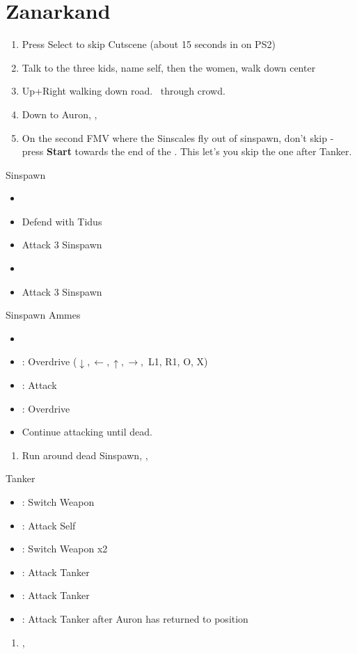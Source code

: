 \chapter{Zanarkand}\label{ch:zanarkand}

\begin{enumerate}
	\item Press Select to skip Cutscene (about 15 seconds in on PS2)
	\item Talk to the three kids, name self, then the women, walk down center
	\item Up+Right walking down road. \sd \ through crowd. \skippablefmv
	\item Down to Auron, \sd, \skippablefmv
	\item On the second FMV where the Sinscales fly out of sinspawn, don't skip - press \textbf{Start} towards the end of the \fmv. This let's you skip the one after Tanker. \sd
\end{enumerate}
\begin{battle}{Sinspawn}
	\begin{itemize}
		\item \sd
		\item Defend with Tidus
		\item Attack 3 Sinspawn
		\item \sd
		\item Attack 3 Sinspawn
	\end{itemize}
\end{battle}
\begin{battle}[2400]{Sinspawn Ammes}
	\begin{itemize}
		\item \sd
		\item \auron: Overdrive ($\downarrow, \leftarrow, \uparrow, \rightarrow,$ L1, R1, O, X)
		\item \tidus: Attack
		\item \tidus: Overdrive
		\item Continue attacking until dead.
	\end{itemize}
\end{battle}
\begin{enumerate}[resume]
	\item Run around dead Sinspawn, \save, \sd
\end{enumerate}
\begin{battle}[1000]{Tanker}
	\begin{itemize}
		\item \tidus: Switch Weapon
		\item \auron: Attack Self
		\item \tidus: Switch Weapon x2
		\item \tidus: Attack Tanker
		\item \auron: Attack Tanker
		\item \tidus: Attack Tanker after Auron has returned to position
	\end{itemize}
\end{battle}
\begin{enumerate}[resume]
	\item \cs[2:00], \skippablefmv
\end{enumerate}